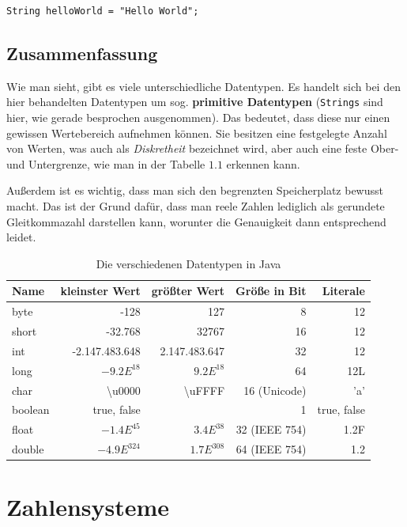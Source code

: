 \begin{lstlisting}
String helloWorld = "Hello World";
\end{lstlisting}

\subsection{Zusammenfassung}

Wie man sieht, gibt es viele unterschiedliche Datentypen. Es handelt sich bei den hier behandelten Datentypen um sog. \textbf{primitive Datentypen} (\texttt{Strings} sind hier, wie gerade besprochen ausgenommen). Das bedeutet, dass diese nur einen gewissen Wertebereich aufnehmen können. Sie besitzen eine festgelegte Anzahl von Werten, was auch als \textit{Diskretheit} bezeichnet wird, aber auch eine feste Ober- und Untergrenze, wie man in der Tabelle $1.1$ erkennen kann. 

Außerdem ist es wichtig, dass man sich den begrenzten Speicherplatz bewusst macht. Das ist der Grund dafür, dass man reele Zahlen lediglich als gerundete Gleitkommazahl darstellen kann, worunter die Genauigkeit dann entsprechend leidet.

\begin{table}[ht] 
\caption{Die verschiedenen Datentypen in Java} 
\centering 
\begin{tabular}{l r r r r} 
\hline\hline 
Name & kleinster Wert & größter Wert & Größe in Bit & Literale\\ [0.5ex]  
\hline 
byte & -128 & 127 & 8 & 12\\
short & -32.768 & 32767 & 16 & 12\\
int & -2.147.483.648 & 2.147.483.647 & 32 & 12\\
long & $-9.2E^{18}$ & $9.2E^{18}$ & 64 & 12L\\
char & \textbackslash u0000 & \textbackslash uFFFF & 16 (Unicode) & 'a'\\
boolean & true, false & & 1 & true, false\\
float & $-1.4E^{45}$  & $3.4E^{38}$ & 32 (IEEE 754) & 1.2F\\
double & $-4.9E^{324}$ & $1.7E^{308}$ & 64 (IEEE 754) & 1.2\\
\hline 
\end{tabular} 
\label{table:nonlin} 
\end{table}




\section{Zahlensysteme} 

